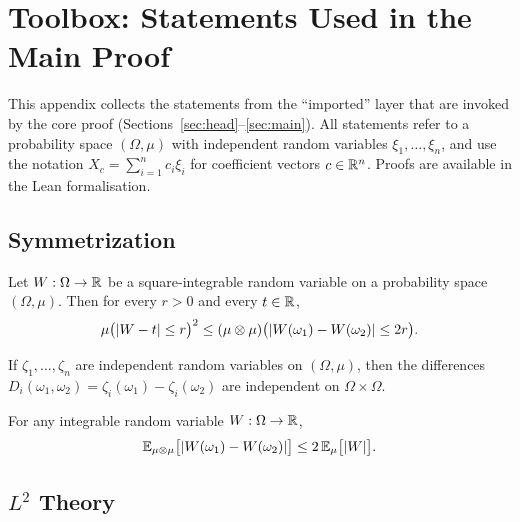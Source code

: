 \section{Toolbox: Statements Used in the Main Proof}\label{app:toolbox}

This appendix collects the statements from the ``imported'' layer that are
invoked by the core proof (Sections~\ref{sec:head}--\ref{sec:main}). All
statements refer to a probability space $(\Omega, \mu)$ with independent
random variables $\xi_1, \dots, \xi_n$, and use the notation
$X_c = \sum_{i=1}^n c_i \xi_i$ for coefficient vectors $c \in \mathbb{R}^n$.
Proofs are available in the Lean formalisation.

\subsection{Symmetrization}

\begin{theorem}[Unsymmetrization]\label{thm:unsymmetrization-app}
Let $W : \Omega \to \mathbb{R}$ be a square-integrable random variable on a
probability space $(\Omega, \mu)$. Then for every $r > 0$ and every
$t \in \mathbb{R}$,
\[
\mu\bigl(\lvert W - t \rvert \le r\bigr)^2
\le
(\mu \otimes \mu)\bigl(\lvert W(\omega_1) - W(\omega_2) \rvert \le 2r\bigr).
\]
\end{theorem}

\begin{theorem}%
\label{thm:iIndepFun-differences-app}
If $\zeta_1, \dots, \zeta_n$ are independent random variables on
$(\Omega, \mu)$, then the differences
$D_i(\omega_1, \omega_2) = \zeta_i(\omega_1) - \zeta_i(\omega_2)$ are
independent on $\Omega \times \Omega$.
\end{theorem}

\begin{theorem}\label{thm:desymm-l1-app}
For any integrable random variable $W : \Omega \to \mathbb{R}$,
\[
\mathbb{E}_{\mu \otimes \mu}\bigl[\lvert W(\omega_1) - W(\omega_2) \rvert\bigr]
\le
2 \, \mathbb{E}_\mu\bigl[\lvert W \rvert\bigr].
\]
\end{theorem}

\subsection{$L^2$ Theory}

